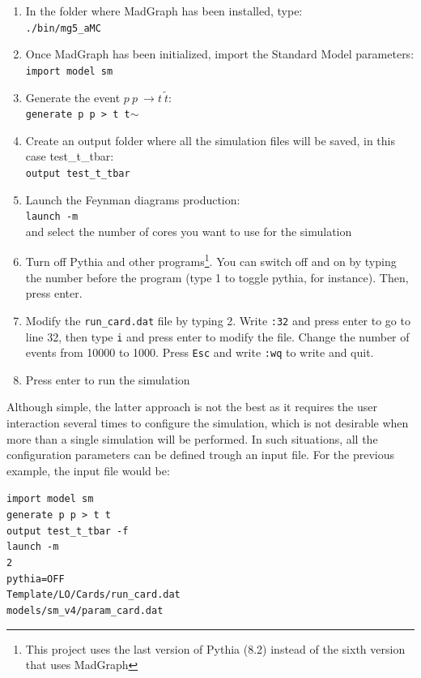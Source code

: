 \documentclass[12pt, oneside]{book}              %
\begin{document}
\begin{enumerate}
\item In the folder where MadGraph has been installed, type:  
\\ \texttt{./bin/mg5\_aMC}
\item Once MadGraph has been initialized, import the Standard Model parameters:
\\ \texttt{import model sm}
\item Generate the event $ p\ p\ \to t\ \tilde{t} $:
\\ \texttt{generate p p > t t$ \sim $}
\item Create an output folder where all the simulation files will be saved, in this case
test\_t\_tbar:
\\ \texttt{output test\_t\_tbar} 
\item Launch the Feynman diagrams production:
\\ \texttt{launch -m}
\\ and select the number of cores you want to use for the simulation
\item Turn off Pythia and other programs\footnote{This project uses the last version 
of Pythia (8.2) instead of the sixth version that uses MadGraph}. You can switch 
off and on by typing the number before the program (type 1 to toggle pythia, for instance).
Then, press enter.
\item Modify the \texttt{run\_card.dat} file by typing 2. Write \texttt{:32} and press
enter to go to line 32, then type \texttt{i} and press enter to modify the file. Change
the number of events from 10000 to 1000. Press \texttt{Esc} and write \texttt{:wq} to
write and quit.
\item Press enter to run the simulation

\end{enumerate}

Although simple, the latter approach is not the best as it requires the user interaction
several times to configure the simulation, which is not desirable when more than a single 
simulation will be performed. In such situations, all the configuration parameters
can be defined trough an input file. For the previous example, the input file would be:

\noindent \texttt{import model sm
\\generate p p > t t\~
\\output test\_t\_tbar -f
\\launch -m
\\2
\\pythia=OFF
\\Template/LO/Cards/run\_card.dat
\\models/sm\_v4/param\_card.dat}
\end{document}
